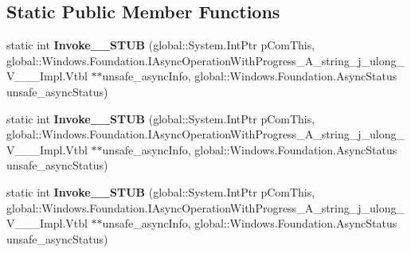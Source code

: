 \subsection*{Static Public Member Functions}
\begin{DoxyCompactItemize}
\item 
\mbox{\label{struct_windows_1_1_foundation_1_1_async_operation_with_progress_completed_handler___a__string__j__ulong___v_______impl_1_1_vtbl_a13990c38e21f50cfe24e453df8ff9ff4}} 
static int {\bfseries Invoke\+\_\+\+\_\+\+S\+T\+UB} (global\+::\+System.\+Int\+Ptr p\+Com\+This, global\+::\+Windows.\+Foundation.\+I\+Async\+Operation\+With\+Progress\+\_\+\+A\+\_\+string\+\_\+j\+\_\+ulong\+\_\+\+V\+\_\+\+\_\+\+\_\+\+Impl.\+Vtbl $\ast$$\ast$unsafe\+\_\+async\+Info, global\+::\+Windows.\+Foundation.\+Async\+Status unsafe\+\_\+async\+Status)
\item 
\mbox{\label{struct_windows_1_1_foundation_1_1_async_operation_with_progress_completed_handler___a__string__j__ulong___v_______impl_1_1_vtbl_a13990c38e21f50cfe24e453df8ff9ff4}} 
static int {\bfseries Invoke\+\_\+\+\_\+\+S\+T\+UB} (global\+::\+System.\+Int\+Ptr p\+Com\+This, global\+::\+Windows.\+Foundation.\+I\+Async\+Operation\+With\+Progress\+\_\+\+A\+\_\+string\+\_\+j\+\_\+ulong\+\_\+\+V\+\_\+\+\_\+\+\_\+\+Impl.\+Vtbl $\ast$$\ast$unsafe\+\_\+async\+Info, global\+::\+Windows.\+Foundation.\+Async\+Status unsafe\+\_\+async\+Status)
\item 
\mbox{\label{struct_windows_1_1_foundation_1_1_async_operation_with_progress_completed_handler___a__string__j__ulong___v_______impl_1_1_vtbl_a13990c38e21f50cfe24e453df8ff9ff4}} 
static int {\bfseries Invoke\+\_\+\+\_\+\+S\+T\+UB} (global\+::\+System.\+Int\+Ptr p\+Com\+This, global\+::\+Windows.\+Foundation.\+I\+Async\+Operation\+With\+Progress\+\_\+\+A\+\_\+string\+\_\+j\+\_\+ulong\+\_\+\+V\+\_\+\+\_\+\+\_\+\+Impl.\+Vtbl $\ast$$\ast$unsafe\+\_\+async\+Info, global\+::\+Windows.\+Foundation.\+Async\+Status unsafe\+\_\+async\+Status)
\item 
\mbox{\label{struct_windows_1_1_foundation_1_1_async_operation_with_progress_completed_handler___a__string__j__ulong___v_______impl_1_1_vtbl_a13990c38e21f50cfe24e453df8ff9ff4}} 
$$
\end{DoxyCompactItemize}
